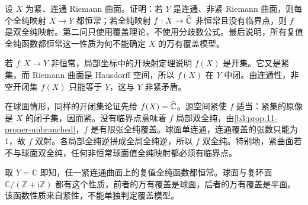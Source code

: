 \begin{exercise}[紧曲面映向何处]\label{b3:ex:12-2}
设 \(X\) 为紧、连通 Riemann 曲面。证明：若 \(Y\) 是连通、非紧 Riemann 曲面，则每个全纯映射 \(X\rightarrow Y\) 都恒常；若全纯映射 \(f:X\rightarrow\widehat{\mathbb C\kern0pt}\) 非恒常且没有临界点，则 \(f\) 是双全纯映射。第二问只使用覆盖理论，不使用分歧数公式。最后说明，所有复值全纯函数都恒常这一性质为何不能确定 \(X\) 的万有覆盖模型。
\end{exercise}
\begin{solution}
若 \(f:X\rightarrow Y\) 非恒常，局部坐标中的开映射定理说明 \(f(X)\) 是开集。它又是紧集，而 Riemann 曲面是 Hausdorff 空间，所以 \(f(X)\) 在 \(Y\) 中闭。由连通性，非空开闭集 \(f(X)\) 只能等于 \(Y\)，这与 \(Y\) 非紧矛盾。

在球面情形，同样的开闭集论证先给 \(f(X)=\widehat{\mathbb C\kern0pt}\)。源空间紧使 \(f\) 适当：紧集的原像是 \(X\) 的闭子集，因而紧。没有临界点意味着 \(f\) 局部双全纯，由\cref{b3:prop:11-proper-unbranched}，\(f\) 是有限张全纯覆盖。球面单连通，连通覆盖的张数只能为1，故 \(f\) 双射。各局部全纯逆拼成全局全纯逆，所以 \(f\) 双全纯。特别地，紧曲面若不与球面双全纯，任何非恒常球面值全纯映射都必须有临界点。

取 \(Y=\mathbb C\) 即知，任一紧连通曲面上的复值全纯函数都恒常。球面与复环面 \(\mathbb C/(\mathbb Z+\mathrm i\mathbb Z)\) 都有这个性质，前者的万有覆盖是球面，后者的万有覆盖是平面。该函数性质来自紧性，不能单独判定覆盖模型。
\end{solution}

